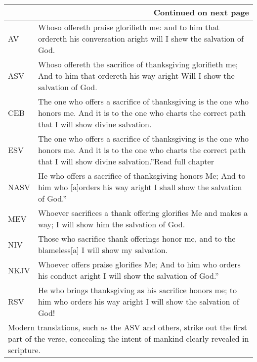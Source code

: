\begin{mdframed}[style=MyFrame]
\begin{center}
\begin{longtable}{|p{.5in}|p{3.5in}|}
\hline \multicolumn{2}{|r|}{{Continued on next page}} \\ \hline
\endfoot 
\textcolor[rgb]{0.00,0.00,1.00}{AV} & \textcolor[rgb]{0.00,0.00,1.00}{Whoso offereth praise glorifieth me: and to him that ordereth his conversation aright will I shew the salvation of God.} \\ \hline
%
ASV &  Whoso offereth the sacrifice of thanksgiving glorifieth me; And to him that ordereth his way aright Will I show the salvation of God. \\ \hline
%
CEB &  The one who offers a sacrifice of thanksgiving is the one who honors me.  And it is to the one who charts the correct path that I will show divine salvation.\\ \hline
%
ESV & The one who offers a sacrifice of thanksgiving is the one who honors me.     And it is to the one who charts the correct path that I will show divine salvation.”Read full chapter \\ \hline
%
NASV &  He who offers a sacrifice of thanksgiving honors Me; And to him who [a]orders his way aright I shall show the salvation of God.” \\ \hline
%
MEV & Whoever sacrifices a thank offering  glorifies Me and makes a way;  I will show him the salvation of God.\\ \hline
%
NIV &  Those who sacrifice thank offerings honor me,  and to the blameless[a] I will show my salvation.\\ \hline
%
NKJV &  Whoever offers praise glorifies Me; And to him who orders his conduct aright I will show the salvation of God.”\\ \hline
%
RSV &  He who brings thanksgiving as his sacrifice honors me;   to him who orders his way aright  I will show the salvation of God!\\ \hline

\multicolumn{2}{p{4.3in}}{{Modern translations, such as the ASV and others, strike out the first part of the verse, concealing the intent of mankind clearly revealed in scripture. }} \\ %

\hline

\end{longtable}
\end{center}

\normalsize 
\end{mdframed}